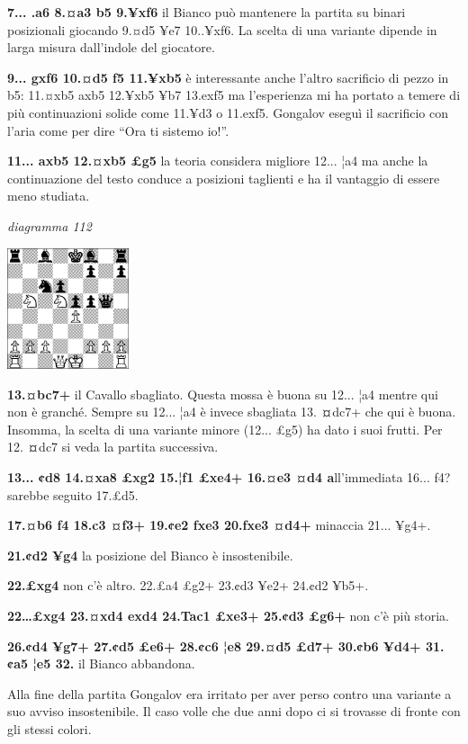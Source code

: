 \documentclass[
]{article}
\begin{document}
\textbf{7... .a6 8.¤a3 b5 9.¥xf6} il Bianco può mantenere la partita su
binari posizionali giocando 9.¤d5 ¥e7 10..¥xf6. La scelta di una
variante dipende in larga misura dall'indole del giocatore.

\textbf{9... gxf6 10.¤d5 f5 11.¥xb5} è interessante anche l'altro
sacrificio di pezzo in b5: 11.¤xb5 axb5 12.¥xb5 ¥b7 13.exf5 ma
l'esperienza mi ha portato a temere di più continuazioni solide come
11.¥d3 o 11.exf5. Gongalov eseguì il sacrificio con l'aria come per dire
``Ora ti sistemo io!''.

\textbf{11... axb5 12.¤xb5 £g5} la teoria considera migliore 12... ¦a4
ma anche la continuazione del testo conduce a posizioni taglienti e ha
il vantaggio di essere meno studiata.

\emph{diagramma 112}

\includegraphics[width=1.40139in,height=1.40139in]{vertopal_109f12be458a423d8f3cc838880eaea2/media/image112.png}

\textbf{13.¤bc7+} il Cavallo sbagliato. Questa mossa è buona su 12...
¦a4 mentre qui non è granché. Sempre su 12... ¦a4 è invece sbagliata 13.
\textbf{¤}dc7+ che qui è buona. Insomma, la scelta di una variante
minore (12... £g5) ha dato i suoi frutti. Per 12. \textbf{¤}dc7 si veda
la partita successiva.

\textbf{13... ¢d8 14.¤xa8 £xg2 15.¦f1 £xe4+ 16.¤e3 ¤d4 a}ll'immediata
16... f4? sarebbe seguito 17.£d5.

\textbf{17.¤b6 f4 18.c3 ¤f3+ 19.¢e2 fxe3 20.fxe3 ¤d4+} minaccia 21...
¥g4+.

\textbf{21.¢d2 ¥g4} la posizione del Bianco è insostenibile.

\textbf{22.£xg4} non c'è altro. 22.£a4 £g2+ 23.¢d3 ¥e2+ 24.¢d2 ¥b5+.

\textbf{22\ldots£xg4 23.¤xd4 exd4 24.Tac1 £xe3+ 25.¢d3 £g6+} non c'è più
storia.

\textbf{26.¢d4 ¥g7+ 27.¢d5 £e6+ 28.¢c6 ¦e8 29.¤d5 £d7+ 30.¢b6 ¥d4+
31.¢a5 ¦e5 32.} il Bianco abbandona.

Alla fine della partita Gongalov era irritato per aver perso contro una
variante a suo avviso insostenibile. Il caso volle che due anni dopo ci
si trovasse di fronte con gli stessi colori.
\end{document}
